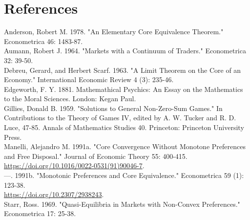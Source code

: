 \documentclass[10pt]{article}
\begin{document}
\section*{References}
Anderson, Robert M. 1978. "An Elementary Core Equivalence Theorem." Econometrica 46: 1483-87.\\
Aumann, Robert J. 1964. "Markets with a Continuum of Traders." Econometrica 32: 39-50.\\
Debreu, Gerard, and Herbert Scarf. 1963. "A Limit Theorem on the Core of an Economy." International Economic Review 4 (3): 235-46.\\
Edgeworth, F. Y. 1881. Mathemathical Psychics: An Essay on the Mathematics to the Moral Sciences. London: Kegan Paul.\\
Gillies, Donald B. 1959. "Solutions to General Non-Zero-Sum Games." In Contributions to the Theory of Games IV, edited by A. W. Tucker and R. D. Luce, 47-85. Annals of Mathematics Studies 40. Princeton: Princeton University Press.\\
Manelli, Alejandro M. 1991a. "Core Convergence Without Monotone Preferences and Free Disposal." Journal of Economic Theory 55: 400-415. \href{https://doi.org/10.1016/0022-0531(91)90046-7}{https://doi.org/10.1016/0022-0531(91)90046-7}.\\
---. 1991b. "Monotonic Preferences and Core Equivalence." Econometrica 59 (1): 123-38.\\
\href{https://doi.org/10.2307/2938243}{https://doi.org/10.2307/2938243}.\\
Starr, Ross. 1969. "Quasi-Equilibria in Markets with Non-Convex Preferences." Econometrica 17: 25-38.
\end{document}
